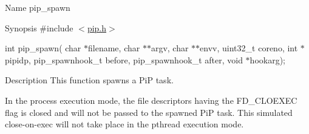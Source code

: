 \begin{DoxyParagraph}{Name}
pip\-\_\-spawn
\end{DoxyParagraph}
\begin{DoxyParagraph}{Synopsis}
\#include $<$\hyperlink{pip_8h_source}{pip.\-h}$>$ \par
int pip\-\_\-spawn( char $\ast$filename, char $\ast$$\ast$argv, char $\ast$$\ast$envv, uint32\-\_\-t coreno, int $\ast$pipidp, pip\-\_\-spawnhook\-\_\-t before, pip\-\_\-spawnhook\-\_\-t after, void $\ast$hookarg);
\end{DoxyParagraph}
\begin{DoxyParagraph}{Description}
This function spawns a Pi\-P task. 
\end{DoxyParagraph}
\begin{DoxyParagraph}{}
In the process execution mode, the file descriptors having the {\ttfamily F\-D\-\_\-\-C\-L\-O\-E\-X\-E\-C} flag is closed and will not be passed to the spawned Pi\-P task. This simulated close-\/on-\/exec will not take place in the pthread execution mode.
\end{DoxyParagraph}

